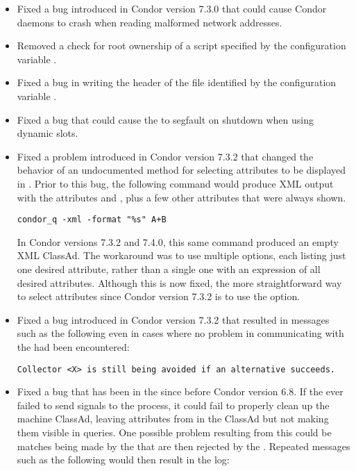 \begin{itemize}
\item Fixed a bug introduced in Condor version 7.3.0 that could cause 
Condor daemons to crash when reading malformed network addresses.

\item Removed a check for root ownership of a script specified by
the configuration variable .

\item Fixed a bug in writing the header of the file identified by
the configuration variable .

\item Fixed a bug that could cause the  to segfault on shutdown
when using dynamic slots.

\item Fixed a problem introduced in Condor version 7.3.2 that changed 
  the behavior of
  an undocumented method for selecting attributes to be displayed in
   .  Prior to this bug, the following command
  would produce XML output with the attributes  and ,
  plus a few other attributes that were always shown.

\begin{verbatim}
condor_q -xml -format "%s" A+B
\end{verbatim}

In Condor versions 7.3.2 and 7.4.0,
this same command produced an empty XML ClassAd.
The workaround was to use multiple  options, each listing
just one desired attribute, rather than a single one with an
expression of all desired attributes.  Although this is now fixed, the
more straightforward way to select attributes since Condor version 7.3.2
is to use the  option.

\item Fixed a bug introduced in Condor version 7.3.2 that resulted in 
  messages such
  as the following even in cases where no problem in communicating
  with the  had been encountered:

\begin{verbatim}
Collector <X> is still being avoided if an alternative succeeds.
\end{verbatim}

\item Fixed a bug that has been in the  since before
  Condor version 6.8.  If the  ever failed to send signals to the
   process, it could fail to properly clean up the
  machine ClassAd, leaving attributes from
   in the ClassAd but not making them visible
  in  queries.  One possible problem resulting from
  this could be matches being made by the  that are then
  rejected by the .  Repeated messages such as the following
  would then result in the  log:


\end{itemize}
